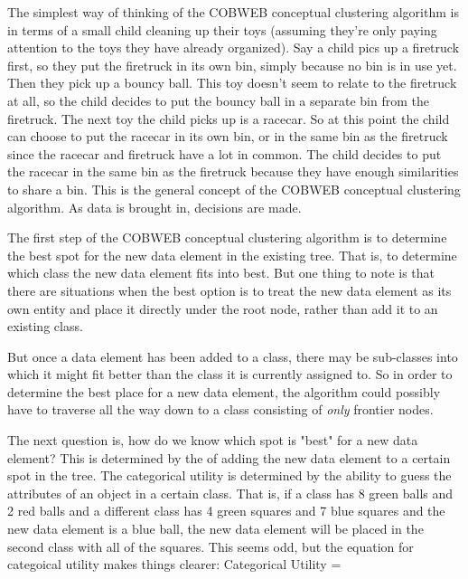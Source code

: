 The simplest way of thinking of the COBWEB conceptual clustering algorithm is in
terms of a small child cleaning up their toys (assuming they're only paying
attention to the toys they have already organized). Say a child pics up a
firetruck first, so they put the firetruck in its own bin, simply because no
bin is in use yet. Then they pick up a bouncy ball. This toy doesn't seem to
relate to the firetruck at all, so the child decides to put the bouncy ball in a
separate bin from the firetruck. The next toy the child picks up is a racecar.
So at this point the child can choose to put the racecar in its own bin, or in
the same bin as the firetruck since the racecar and firetruck have a lot in
common. The child decides to put the racecar in the same bin as the firetruck
because they have enough similarities to share a bin. This is the general
concept of the COBWEB conceptual clustering algorithm. As data is brought in,
decisions are made.

The first step of the COBWEB conceptual clustering algorithm is to determine the
best spot for the new data element in the existing tree. That is, to determine
which class the new data element fits into best. But one thing to note is that
there are situations when the best option is to treat the new data element as
its own entity and place it directly under the root node, rather than add it to
an existing class.

But once a data element has been added to a class, there may be sub-classes into
which it might fit better than the class it is currently assigned to. So in
order to determine the best place for a new data element, the algorithm could
possibly have to traverse all the way down to a class consisting of \emph{only}
frontier nodes.

The next question is, how do we know which spot is "best" for a new data
element? This is determined by the  of adding the new
data element to a certain spot in the tree. The categorical utility is
determined by the ability to guess the attributes of an object in a certain
class. That is, if a class has 8 green balls and 2 red balls and a different
class has 4 green squares and 7 blue squares and the new data element is a blue
ball, the new data element will be placed in the second class with all of the
squares. This seems odd, but the equation for categoical utility makes things
clearer:
Categorical Utility = 










